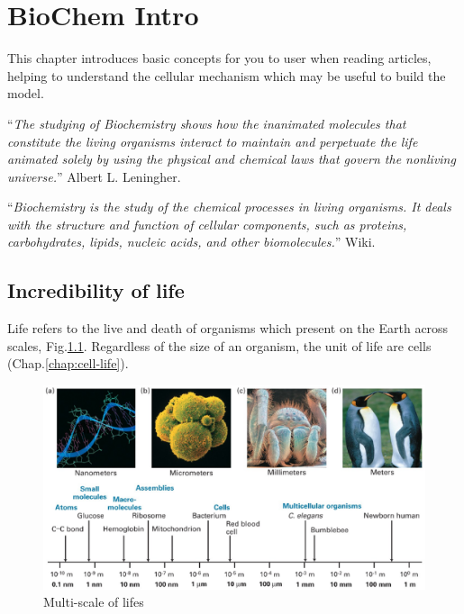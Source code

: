 \chapter{BioChem Intro}
\label{chap:biochem-intro}

This chapter introduces basic concepts for you to user when reading articles,
helping to understand the cellular mechanism which may be useful to build the
model.


``{\it The studying of Biochemistry shows how the inanimated molecules
  that constitute the living organisms interact to maintain and perpetuate the
  life animated solely by using the physical and chemical laws that govern the
  nonliving universe.}'' Albert L. Leningher.

``{\it Biochemistry is the study of the chemical processes in living
organisms. It deals with the structure and function of cellular
components, such as proteins, carbohydrates, lipids, nucleic acids,
and other biomolecules.}'' Wiki.


\section{Incredibility of life}
\label{sec:incredibility-life}

Life refers to the live and death of organisms which present on the Earth across
scales, Fig.\ref{fig:smallness}. Regardless of the size of an organism, the unit
of life are cells (Chap.\ref{chap:cell-life}).

\begin{figure}[hbt]
  \centerline{\includegraphics[height=6cm,
    angle=0]{./images/smallness.eps}}
\caption{Multi-scale of lifes}
\label{fig:smallness}
\end{figure}

